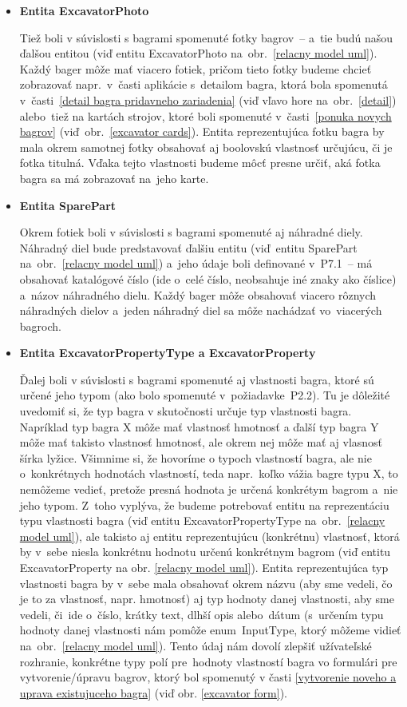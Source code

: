 \begin{itemize}
\item \textbf{Entita ExcavatorPhoto}

Tiež boli v súvislosti s bagrami spomenuté fotky bagrov~-- a~tie budú našou ďalšou entitou (viď entitu ExcavatorPhoto na~obr.~\ref{relacny model uml}). Každý bager môže mať viacero fotiek, pričom tieto fotky budeme chcieť zobrazovať napr.~v~časti aplikácie s~detailom bagra, ktorá bola spomenutá v~časti~\ref{detail bagra pridavneho zariadenia} (viď vľavo hore na~obr.~\ref{detail}) alebo~tiež na kartách strojov, ktoré boli spomenuté v~časti~\ref{ponuka novych bagrov} (viď~obr.~\ref{excavator cards}). Entita reprezentujúca fotku bagra by mala okrem samotnej fotky obsahovať aj boolovskú vlastnosť určujúcu, či je fotka titulná. Vďaka tejto vlastnosti budeme môcť presne určiť, aká fotka bagra sa má zobrazovať na~jeho karte.

\item \textbf{Entita SparePart}

Okrem fotiek boli v súvislosti s bagrami spomenuté aj náhradné diely. Náhradný diel bude predstavovať ďalšiu entitu (viď~entitu SparePart na~obr.~\ref{relacny model uml}) a~jeho údaje boli definované v~P7.1~-- má obsahovať katalógové číslo (ide o~celé číslo, neobsahuje iné znaky ako číslice) a~názov náhradného dielu. Každý bager môže obsahovať viacero rôznych náhradných dielov a~jeden náhradný diel sa môže nachádzať vo~viacerých bagroch.

\item \textbf{Entita ExcavatorPropertyType a ExcavatorProperty}

Ďalej boli v súvislosti s bagrami spomenuté aj vlastnosti bagra, ktoré sú určené jeho typom (ako bolo spomenuté v~požiadavke~P2.2). Tu je dôležité uvedomiť si, že typ bagra v skutočnosti určuje typ vlastnosti bagra. Napríklad typ bagra X môže mať vlastnosť hmotnosť a ďalší typ bagra Y môže mať takisto vlastnosť hmotnosť, ale okrem nej môže mať aj vlasnosť šírka lyžice. Všimnime si, že hovoríme o typoch vlastností bagra, ale nie o~konkrétnych hodnotách vlastností, teda napr.~koľko vážia bagre typu X, to nemôžeme vedieť, pretože presná hodnota je určená konkrétym bagrom a~nie jeho typom. Z~toho vyplýva, že budeme potrebovať entitu na reprezentáciu typu vlastnosti bagra (viď entitu ExcavatorPropertyType na~obr.~\ref{relacny model uml}), ale takisto aj entitu reprezentujúcu (konkrétnu) vlastnosť, ktorá by v~sebe niesla konkrétnu hodnotu určenú konkrétnym bagrom (viď entitu ExcavatorProperty na obr. \ref{relacny model uml}). Entita reprezentujúca typ vlastnosti bagra by v~sebe mala obsahovať okrem názvu (aby sme vedeli, čo je to za vlastnosť, napr. hmotnosť) aj typ hodnoty danej vlastnosti, aby sme vedeli, či~ide o~číslo, krátky text, dlhší opis alebo~dátum (s~určením typu hodnoty danej vlastnosti nám pomôže enum~InputType, ktorý môžeme vidieť na~obr.~\ref{relacny model uml}). Tento údaj nám dovolí zlepšiť užívateľské rozhranie, konkrétne typy polí pre~hodnoty vlastností bagra vo formulári pre vytvorenie/úpravu bagrov, ktorý bol spomenutý v časti \ref{vytvorenie noveho a uprava existujuceho bagra} (viď obr. \ref{excavator form}).


\end{itemize}

